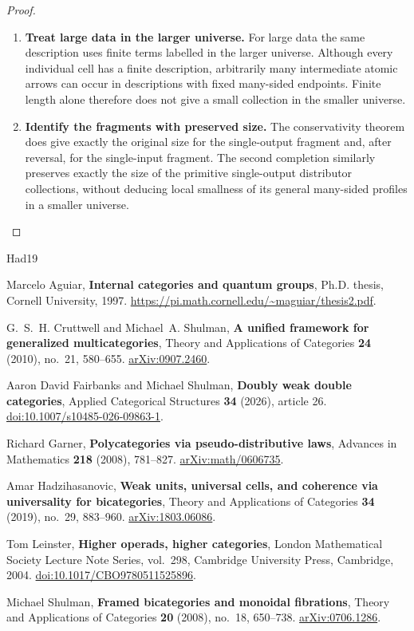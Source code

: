\documentclass[11pt,reqno]{amsart}
\theoremstyle{plain}
\theoremstyle{definition}
\theoremstyle{remark}
\numberwithin{equation}{section}
\begin{document}
\begin{proof}
\begin{enumerate}
\item \textbf{Treat large data in the larger universe.} For large data the same description uses finite terms labelled in
the larger universe. Although every individual cell has a finite
description, arbitrarily many intermediate atomic arrows can occur
in descriptions with fixed many-sided endpoints. Finite length
alone therefore does not give a small collection in the smaller
universe.

\item \textbf{Identify the fragments with preserved size.} The conservativity theorem does give exactly the original
size for the single-output fragment and, after reversal, for the
single-input fragment.
The second completion similarly preserves exactly the size of the
primitive single-output distributor collections, without deducing local
smallness of its general many-sided profiles in a smaller universe.\qedhere
\end{enumerate}
\end{proof}

\begin{thebibliography}{Had19}

Marcelo Aguiar,
\textbf{Internal categories and quantum groups},
Ph.D. thesis, Cornell University, 1997.
\url{https://pi.math.cornell.edu/~maguiar/thesis2.pdf}.

G.~S.~H. Cruttwell and Michael~A. Shulman,
\textbf{A unified framework for generalized multicategories},
Theory and Applications of Categories \textbf{24} (2010), no.~21,
580--655.
\href{https://arxiv.org/abs/0907.2460}{arXiv:0907.2460}.

Aaron David Fairbanks and Michael Shulman,
\textbf{Doubly weak double categories},
Applied Categorical Structures \textbf{34} (2026), article 26.
\href{https://doi.org/10.1007/s10485-026-09863-1}
{doi:10.1007/s10485-026-09863-1}.

Richard Garner,
\textbf{Polycategories via pseudo-distributive laws},
Advances in Mathematics \textbf{218} (2008), 781--827.
\href{https://arxiv.org/abs/math/0606735}{arXiv:math/0606735}.

Amar Hadzihasanovic,
\textbf{Weak units, universal cells, and coherence via universality for
bicategories},
Theory and Applications of Categories \textbf{34} (2019), no.~29,
883--960.
\href{https://arxiv.org/abs/1803.06086}{arXiv:1803.06086}.

Tom Leinster,
\textbf{Higher operads, higher categories},
London Mathematical Society Lecture Note Series, vol.~298,
Cambridge University Press, Cambridge, 2004.
\href{https://doi.org/10.1017/CBO9780511525896}
{doi:10.1017/CBO9780511525896}.

Michael Shulman,
\textbf{Framed bicategories and monoidal fibrations},
Theory and Applications of Categories \textbf{20} (2008), no.~18,
650--738.
\href{https://arxiv.org/abs/0706.1286}{arXiv:0706.1286}.

\end{thebibliography}
\end{document}

